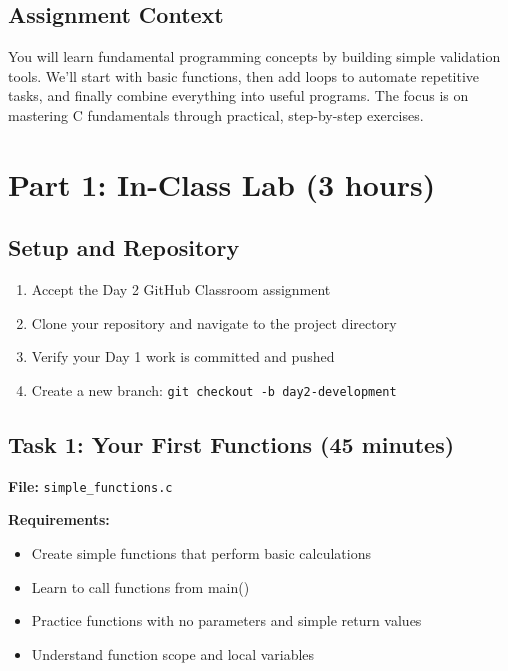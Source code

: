 \documentclass[11pt,a4paper]{article}
\begin{document}
\subsection{Assignment Context}
You will learn fundamental programming concepts by building simple validation tools. We'll start with basic functions, then add loops to automate repetitive tasks, and finally combine everything into useful programs. The focus is on mastering C fundamentals through practical, step-by-step exercises.

\section{Part 1: In-Class Lab (3 hours)}

\subsection{Setup and Repository}
\begin{enumerate}
    \item Accept the Day 2 GitHub Classroom assignment
    \item Clone your repository and navigate to the project directory
    \item Verify your Day 1 work is committed and pushed
    \item Create a new branch: \texttt{git checkout -b day2-development}
\end{enumerate}

\subsection{Task 1: Your First Functions (45 minutes)}

\textbf{File:} \texttt{simple\_functions.c}

\textbf{Requirements:}
\begin{itemize}
    \item Create simple functions that perform basic calculations
    \item Learn to call functions from main()
    \item Practice functions with no parameters and simple return values
    \item Understand function scope and local variables
\end{itemize}
\end{document}
